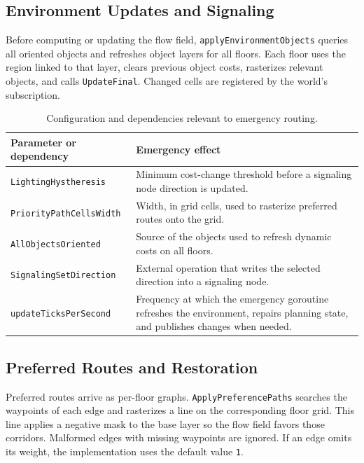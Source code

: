 \documentclass[12pt,a4paper]{report}
\begin{document}
\subsection{Environment Updates and Signaling}

Before computing or updating the flow field, \texttt{applyEnvironmentObjects}
queries all oriented objects and refreshes object layers for all floors. Each
floor uses the region linked to that layer, clears previous object costs,
rasterizes relevant objects, and calls \texttt{UpdateFinal}. Changed cells are
registered by the world's subscription.

\begin{table}[H]
\centering
\begin{tabular}{|p{}|p{}|}
\hline
\textbf{Parameter or dependency} & \textbf{Emergency effect} \\
\hline
\texttt{LightingHystheresis} &
Minimum cost-change threshold before a signaling node direction is updated. \\
\hline
\texttt{PriorityPathCellsWidth} &
Width, in grid cells, used to rasterize preferred routes onto the grid. \\
\hline
\texttt{AllObjectsOriented} &
Source of the objects used to refresh dynamic costs on all floors. \\
\hline
\texttt{SignalingSetDirection} &
External operation that writes the selected direction into a signaling node. \\
\hline
\texttt{updateTicksPerSecond} &
Frequency at which the emergency goroutine refreshes the environment, repairs
planning state, and publishes changes when needed. \\
\hline
\end{tabular}
\caption{Configuration and dependencies relevant to emergency routing.}
\end{table}

\subsection{Preferred Routes and Restoration}

Preferred routes arrive as per-floor graphs. \texttt{ApplyPreferencePaths}
searches the waypoints of each edge and rasterizes a line on the corresponding
floor grid. This line applies a negative mask to the base layer so the flow field
favors those corridors. Malformed edges with missing waypoints are ignored. If
an edge omits its weight, the implementation uses the default value \texttt{1}.
\end{document}
